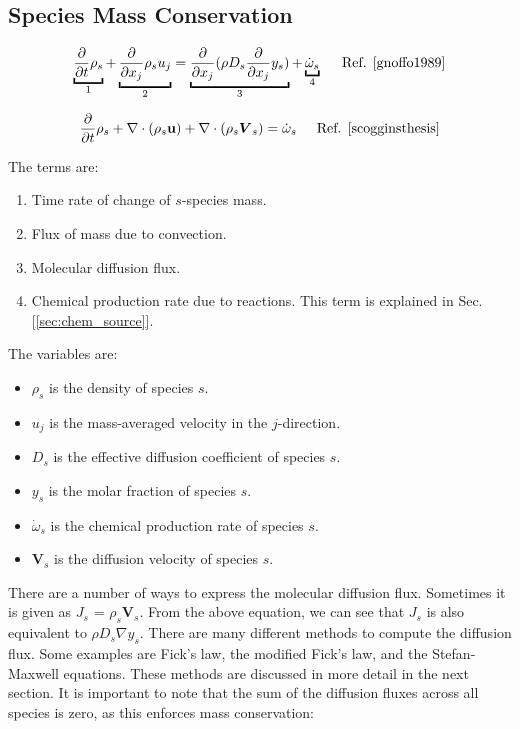 \documentclass[10pt]{article}
\begin{document}
\begin{flushleft}
\subsection{Species Mass Conservation}

\begin{equation}
\underbracket{ \pd{}{t} \rho_s}_1 + \underbracket{\pd{}{x_j} \rho_s u_j}_2 = \underbracket{\pd{}{x_j} (\rho D_s \pd{}{x_j} y_s)}_3 + \underbracket{\dot{\omega}_s}_4  \hspace{5mm}  \text{Ref. \cite{gnoffo1989}}
\end{equation}

\begin{equation} \frac{\partial }{\partial t} \rho_s + \nabla \cdot (\rho_s \textbf{u}) + \nabla \cdot (\rho_s \boldsymbol{V}_s) = \dot{\omega}_s \hspace{5mm} \text{Ref. \cite{scogginsthesis}}
\end{equation}

The terms are:

\begin{enumerate}
    \item Time rate of change of $s$-species mass.
    \item Flux of mass due to convection.
    \item Molecular diffusion flux.
    \item Chemical production rate due to reactions. This term is explained in Sec. [\ref{sec:chem_source}].
\end{enumerate}

The variables are:
\begin{itemize}
    \item $\rho_s$ is the density of species $s$.
    \item $u_j$ is the mass-averaged velocity in the $j$-direction.
    \item $D_s$ is the effective diffusion coefficient of species $s$.
    \item $y_s$ is the molar fraction of species $s$.
    \item $\dot{\omega}_s$ is the chemical production rate of species $s$.
    \item $\boldsymbol{V}_s$ is the diffusion velocity of species $s$.
\end{itemize}

\begin{definition}
There are a number of ways to express the molecular diffusion flux. Sometimes it is given as $J_s$ = $\rho_s \boldsymbol{V}_s$. From the above equation, we can see that $J_s$ is also equivalent to $\rho D_s \nabla y_s$. There are many different methods to compute the diffusion flux. Some examples are Fick's law, the modified Fick's law, and the Stefan-Maxwell equations. These methods are discussed in more detail in the next section. It is important to note that the sum of the diffusion fluxes across all species is zero, as this enforces mass conservation:
\end{definition}



\end{flushleft}
\end{document}
